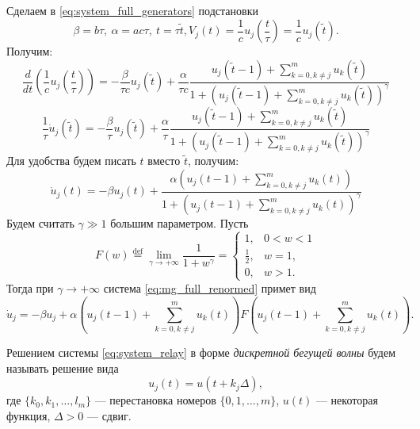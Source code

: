Сделаем в \eqref{eq:system_full_generators} подстановки
%
\begin{equation}
	\label{eq:mg_norm}
	\beta = b \tau, \ \alpha = ac \tau, \ t = \tau \tilde{t}, V_j(t) = \dfrac{1}{c}u_j\left(\dfrac{t}{\tau}\right) = \dfrac{1}{c}u_j(\tilde{t}).
\end{equation}
%
Получим:
%
\begin{equation*}
	\frac{d}{dt} \left(\dfrac{1}{c}u_j\left(\dfrac{t}{\tau}\right)\right)= -\dfrac{\beta}{\tau c}u_j(\tilde{t}) + \dfrac{\alpha}{\tau c}\dfrac{u_j(\tilde{t} - 1) + \sum\limits_{k = 0, k\neq j}^m u_k(\tilde{t})}{1 + \left(u_j(\tilde{t} - 1) + \sum\limits_{k = 0, k\neq j}^m u_k(\tilde{t})\right)^{\gamma}}
\end{equation*}
%
\begin{equation*}
	\frac{1}{\tau} \dot{u}_j(\tilde{t}) = -\dfrac{\beta}{\tau}u_j(\tilde{t}) + \dfrac{\alpha}{\tau}\dfrac{u_j(\tilde{t} - 1) + \sum\limits_{k = 0, k\neq j}^m u_k(\tilde{t})}{1 + \left(u_j(\tilde{t} - 1) + \sum\limits_{k = 0, k\neq j}^m u_k(\tilde{t})\right)^{\gamma}}
\end{equation*}
%
Для удобства будем писать $t$ вместо $\tilde{t}$, получим:
%
\begin{equation}
	\label{eq:mg_full_renormed}
	\dot{u}_j(t) = -\beta u_j(t) + \dfrac{\alpha \left(u_j(t - 1) + \sum\limits_{k = 0, k\neq j}^m u_k(t)\right)}{1 + \left(u_j(t - 1) + \sum\limits_{k = 0, k\neq j}^m u_k(t)\right)^{\gamma}}
\end{equation}
%
Будем считать $\gamma \gg 1$ большим параметром. Пусть 
%
\begin{equation}
\label{eq:relay_function_F}
F(w)\stackrel{\text{def}}{=}\lim\limits_{\gamma\rightarrow+\infty} \frac{1}{1+w^\gamma}=\left\lbrace\begin{array}{cl}
	1, & 0<w<1 \\
	\frac{1}{2}, & w=1, \\
	0, & w>1.
\end{array}\right.
\end{equation}
%
Тогда при $\gamma \to +\infty$ система \eqref{eq:mg_full_renormed} примет вид
%
\begin{equation}
\label{eq:system_relay}
\dot{u}_j=-\beta u_j+\alpha\left(u_j(t-1)+ \sum\limits_{k=0, k\neq j}^{m} u_{k}(t)\right)F\left(u_j(t-1)+\sum\limits_{k=0, k\neq j}^{m} u_{k}(t)\right).
\end{equation}

Решением системы \eqref{eq:system_relay} в форме \emph{дискретной бегущей волны} будем называть решение вида
%
\begin{equation}
	\label{eq:discrete_wave}
	u_j(t) = u(t + k_j\Delta),   
\end{equation}
где $\{k_0, k_1, \ldots, l_m\}$ --- перестановка номеров $\{0, 1, \ldots, m\}$, $u(t)$ --- некоторая функция, $\Delta > 0$ --- сдвиг.

